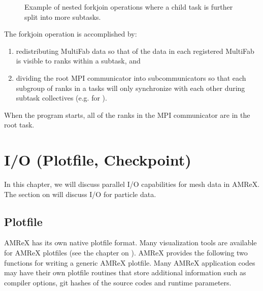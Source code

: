 \documentclass[letterpaper,10pt,english]{sphinxmanual}
\begin{document}
\begin{figure}[htbp]
\centering
\capstart

\noindent{}
\caption{Example of nested fork\sphinxhyphen{}join operations where a child task is further
split into more subtasks.}\label{\detokenize{ForkJoin:id2}}\end{figure}

\sphinxAtStartPar
The fork\sphinxhyphen{}join operation is accomplished by:
\begin{enumerate}
%
\item {} 
\sphinxAtStartPar
redistributing MultiFab data so that  of the data in each
registered MultiFab is visible to ranks within a subtask, and

\item {} 
\sphinxAtStartPar
dividing the root MPI communicator into sub\sphinxhyphen{}communicators so that
each subgroup of ranks in a tasks will only synchronize with each
other during subtask collectives (e.g. for ).

\end{enumerate}

\sphinxAtStartPar
When the program starts, all of the ranks in the MPI communicator are
in the root task.


\chapter{I/O (Plotfile, Checkpoint)}
\label{\detokenize{IO_Chapter:i-o-plotfile-checkpoint}}\label{\detokenize{IO_Chapter:chap-io}}\label{\detokenize{IO_Chapter::doc}}
\sphinxAtStartPar
In this chapter, we will discuss parallel I/O capabilities for mesh
data in AMReX. The section on {\hyperref[\detokenize{Particle:sec-particles-io}]{}} will discuss I/O for
particle data.


\section{Plotfile}
\label{\detokenize{IO:plotfile}}\label{\detokenize{IO:sec-io}}\label{\detokenize{IO::doc}}
\sphinxAtStartPar
AMReX has its own native plotfile format. Many visualization tools are
available for AMReX plotfiles (see the chapter on {\hyperref[\detokenize{Visualization_Chapter:chap-visualization}]{}}).
AMReX provides the following two functions for writing a generic AMReX plotfile.
Many AMReX application codes may have their own plotfile routines that store
additional information such as compiler options, git hashes of the
source codes and  runtime parameters.
\end{document}
